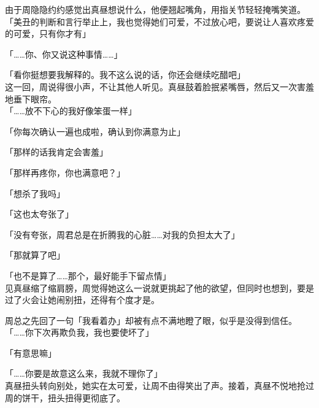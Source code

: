 由于周隐隐约约感觉出真昼想说什么，他便翘起嘴角，用指关节轻轻掩嘴笑道。\\

「美丑的判断和言行举止上，我也觉得她们可爱，不过放心吧，要说让人喜欢疼爱的可爱，只有你才有」

「……你、你又说这种事情……」

「看你挺想要我解释的。我不这么说的话，你还会继续吃醋吧」\\

这一回，周说得很小声，不让其他人听见。真昼鼓着脸抿紧嘴唇，然后又一次害羞地垂下眼帘。\\

「……放不下心的我好像笨蛋一样」

「你每次确认一遍也成啦，确认到你满意为止」

「那样的话我肯定会害羞」

「那样再疼你，你也满意吧？」

「想杀了我吗」

「这也太夸张了」

「没有夸张，周君总是在折腾我的心脏……对我的负担太大了」

「那就算了吧」

「也不是算了……那个，最好能手下留点情」\\

见真昼缩了缩肩膀，周觉得她这么一说就更挑起了他的欲望，但同时也想到，要是过了火会让她闹别扭，还得有个度才是。

周总之先回了一句「我看着办」却被有点不满地瞪了眼，似乎是没得到信任。\\

「……你下次再欺负我，我也要使坏了」

「有意思嘛」

「……你要是故意这么来，我就不理你了」\\

真昼扭头转向别处，她实在太可爱，让周不由得笑出了声。接着，真昼不悦地抢过周的饼干，扭头扭得更彻底了。
